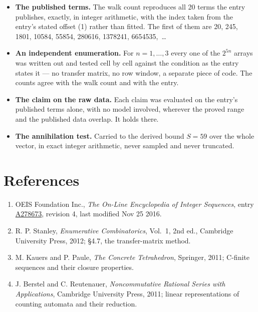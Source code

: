 \documentclass[11pt]{article}
\theoremstyle{definition}
\begin{document}
\begin{itemize}

\item {\bfseries The published terms.} The walk count reproduces all 20 terms the entry publishes, exactly, in integer arithmetic, with the index taken from the entry's stated offset (1) rather than fitted. The first of them are 20, 245, 1801, 10584, 55854, 280616, 1378241, 6654535,~\dots

\item {\bfseries An independent enumeration.} For $n = 1,\dots,3$ every one of the $2^{5n}$ arrays was written out and tested cell by cell against the condition as the entry states it --- no transfer matrix, no row window, a separate piece of code. The counts agree with the walk count and with the entry.

\item {\bfseries The claim on the raw data.} Each claim was evaluated on the entry's published terms alone, with no model involved, wherever the proved range and the published data overlap. It holds there.

\item {\bfseries The annihilation test.} Carried to the derived bound $S = 59$ over the whole vector, in exact integer arithmetic, never sampled and never truncated.

\end{itemize}

\section{References}

\begin{enumerate}

\item OEIS Foundation Inc., \emph{The On-Line Encyclopedia of Integer Sequences}, entry \href{https://oeis.org/A278673}{A278673}, revision 4, last modified Nov 25 2016.

\item R. P. Stanley, \emph{Enumerative Combinatorics}, Vol.~1, 2nd ed., Cambridge University Press, 2012; \S4.7, the transfer-matrix method.

\item M. Kauers and P. Paule, \emph{The Concrete Tetrahedron}, Springer, 2011; C-finite sequences and their closure properties.

\item J. Berstel and C. Reutenauer, \emph{Noncommutative Rational Series with Applications}, Cambridge University Press, 2011; linear representations of counting automata and their reduction.

\end{enumerate}
\end{document}
